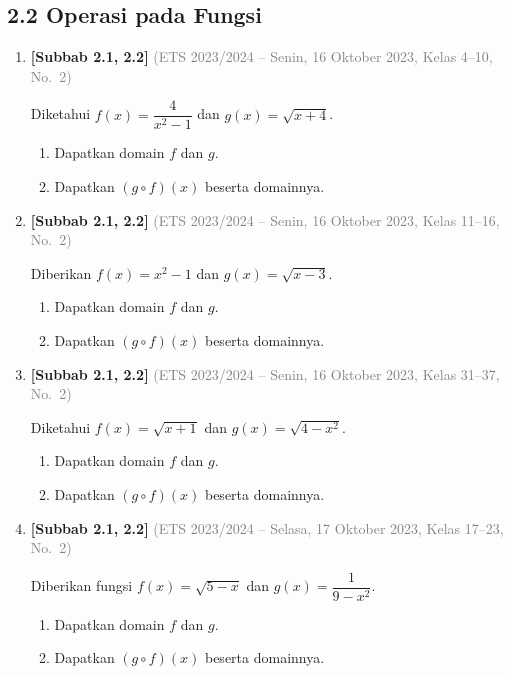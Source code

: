 \documentclass[10pt,openany,a4paper]{article}
\theoremstyle{definition}
\theoremstyle{definition}
\theoremstyle{plain}
\begin{document}
\subsection*{2.2 \quad Operasi pada Fungsi}
\begin{enumerate}
\setcounter{enumi}{0}
    \item \textbf{[Subbab 2.1, 2.2]} {\footnotesize\textcolor{gray}{(ETS 2023/2024 -- Senin, 16 Oktober 2023, Kelas 4--10, No.~2)}}\par
    Diketahui $f(x)=\dfrac{4}{x^2-1}$ dan $g(x)=\sqrt{x+4}$.
    \begin{enumerate}
        \item Dapatkan domain $f$ dan $g$.
        \item Dapatkan $(g\circ f)(x)$ beserta domainnya.
    \end{enumerate}

    \item \textbf{[Subbab 2.1, 2.2]} {\footnotesize\textcolor{gray}{(ETS 2023/2024 -- Senin, 16 Oktober 2023, Kelas 11--16, No.~2)}}\par
    Diberikan $f(x)=x^2-1$ dan $g(x)=\sqrt{x-3}$.
    \begin{enumerate}
        \item Dapatkan domain $f$ dan $g$.
        \item Dapatkan $(g\circ f)(x)$ beserta domainnya.
    \end{enumerate}

    \item \textbf{[Subbab 2.1, 2.2]} {\footnotesize\textcolor{gray}{(ETS 2023/2024 -- Senin, 16 Oktober 2023, Kelas 31--37, No.~2)}}\par
    Diketahui $f(x)=\sqrt{x+1}$ dan $g(x)=\sqrt{4-x^2}$.
    \begin{enumerate}
        \item Dapatkan domain $f$ dan $g$.
        \item Dapatkan $(g\circ f)(x)$ beserta domainnya.
    \end{enumerate}

    \item \textbf{[Subbab 2.1, 2.2]} {\footnotesize\textcolor{gray}{(ETS 2023/2024 -- Selasa, 17 Oktober 2023, Kelas 17--23, No.~2)}}\par
    Diberikan fungsi $f(x)=\sqrt{5-x}$ dan $g(x)=\dfrac{1}{9-x^2}$.
    \begin{enumerate}
        \item Dapatkan domain $f$ dan $g$.
        \item Dapatkan $(g\circ f)(x)$ beserta domainnya.
    \end{enumerate}


\end{enumerate}
\end{document}
